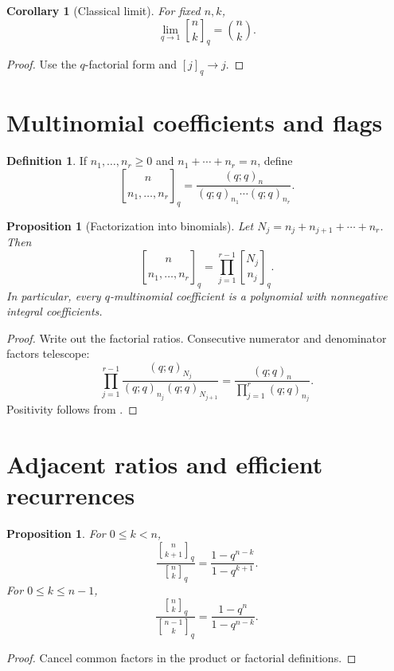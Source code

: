 \documentclass[11pt,oneside,openany]{book}
\newtheorem{proposition}[theorem]{Proposition}
\newtheorem{corollary}[theorem]{Corollary}
\theoremstyle{definition}
\newtheorem{definition}[theorem]{Definition}
\theoremstyle{remark}
\newcommand{\qbinom}[2]{\genfrac{[}{]}{0pt}{}{#1}{#2}_{q}}
\begin{document}
\begin{corollary}[Classical limit]\label{cor:qbinom-classical}
For fixed $n,k$,
\[
 \lim_{q\to1}\qbinom nk=\binom nk.
\]
\end{corollary}

\begin{proof}
Use the $q$-factorial form and $[j]_q\to j$.
\end{proof}

\section{Multinomial coefficients and flags}

\begin{definition}
If $n_1,\dots,n_r\ge0$ and $n_1+\cdots+n_r=n$, define
\[
 \genfrac{[}{]}{0pt}{}{n}{n_1,\ldots,n_r}_q
 =\frac{(q;q)_n}{(q;q)_{n_1}\cdots(q;q)_{n_r}}.
\]
\end{definition}

\begin{proposition}[Factorization into binomials]\label{prop:qmult-factor}
Let $N_j=n_j+n_{j+1}+\cdots+n_r$.  Then
\[
 \genfrac{[}{]}{0pt}{}{n}{n_1,\ldots,n_r}_q
 =\prod_{j=1}^{r-1}\genfrac{[}{]}{0pt}{}{N_j}{n_j}_q.
\]
In particular, every $q$-multinomial coefficient is a polynomial with nonnegative integral coefficients.
\end{proposition}

\begin{proof}
Write out the factorial ratios.  Consecutive numerator and denominator factors telescope:
\[
 \prod_{j=1}^{r-1}
 \frac{(q;q)_{N_j}}{(q;q)_{n_j}(q;q)_{N_{j+1}}}
 =\frac{(q;q)_n}{\prod_{j=1}^{r}(q;q)_{n_j}}.
\]
Positivity follows from .
\end{proof}

\section{Adjacent ratios and efficient recurrences}

\begin{proposition}\label{prop:adjacent-ratio}
For $0\le k<n$,
\[
 \frac{\qbinom n{k+1}}{\qbinom nk}
 =\frac{1-q^{n-k}}{1-q^{k+1}}.
\]
For $0\le k\le n-1$,
\[
 \frac{\qbinom n k}{\qbinom{n-1}k}
 =\frac{1-q^n}{1-q^{n-k}}.
\]
\end{proposition}

\begin{proof}
Cancel common factors in the product or factorial definitions.
\end{proof}
\end{document}
